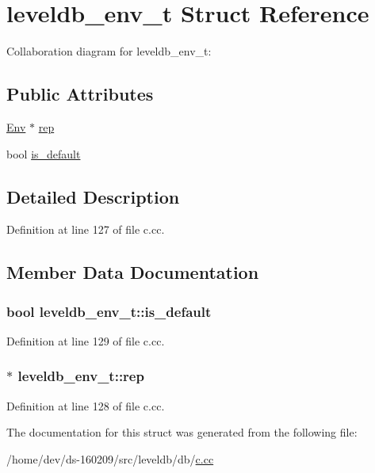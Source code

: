 \hypertarget{structleveldb__env__t}{}\section{leveldb\+\_\+env\+\_\+t Struct Reference}
\label{structleveldb__env__t}


Collaboration diagram for leveldb\+\_\+env\+\_\+t\+:
\subsection*{Public Attributes}
\begin{DoxyCompactItemize}
\item 
\hyperlink{classleveldb_1_1_env}{Env} $\ast$ \hyperlink{structleveldb__env__t_ad41038b41aebaf7ffba1a4bbfaa8b539}{rep}
\item 
bool \hyperlink{structleveldb__env__t_a53e285385a628e932128aec1f0fe1dae}{is\+\_\+default}
\end{DoxyCompactItemize}


\subsection{Detailed Description}


Definition at line 127 of file c.\+cc.



\subsection{Member Data Documentation}
\hypertarget{structleveldb__env__t_a53e285385a628e932128aec1f0fe1dae}{}
\subsubsection[{is\+\_\+default}]{\setlength{\rightskip}{0pt plus 5cm}bool leveldb\+\_\+env\+\_\+t\+::is\+\_\+default}\label{structleveldb__env__t_a53e285385a628e932128aec1f0fe1dae}


Definition at line 129 of file c.\+cc.

\hypertarget{structleveldb__env__t_ad41038b41aebaf7ffba1a4bbfaa8b539}{}
\subsubsection[{rep}]{$\ast$ leveldb\+\_\+env\+\_\+t\+::rep}\label{structleveldb__env__t_ad41038b41aebaf7ffba1a4bbfaa8b539}


Definition at line 128 of file c.\+cc.



The documentation for this struct was generated from the following file\+:\begin{DoxyCompactItemize}
\item 
/home/dev/ds-\/160209/src/leveldb/db/\hyperlink{c_8cc}{c.\+cc}\end{DoxyCompactItemize}
